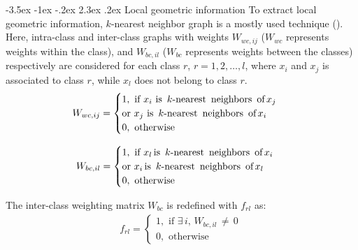 \documentclass[12pt,a4paper,oneside,english]{report}
\makeatletter
\renewcommand\section{\@startsection {section}{1}{\z@}%
                                   {-3.5ex \@plus -1ex \@minus -.2ex}%
                                   {2.3ex \@plus.2ex}%
                                   {\centering\normalfont\LARGE\bfseries}}
\makeatother
\begin{document}
\section{Local geometric information}
To extract local geometric information,  $k$-nearest neighbor graph is a mostly used technique (\cite{hanifelou2018knn}). Here, intra-class and inter-class graphs with weights $W_{wc,ij}$ ($W_{wc}$ represents weights within the class), and $W_{bc,il}$ ($W_{bc}$ represents weights between the classes) respectively are considered for each class $r$, $r=1,2,\ldots, l$, where $x_i$ and $x_j$ is associated to class $r$, while $x_l$ does not belong to class $r$. 
\begin{eqnarray}
W_{wc,ij} = 
\begin{cases}
    1,\,\,\text{if}\,\, x_i\mbox{ is \,$k$-nearest\, neighbors\, of}\, x_j\,\,\nonumber\\ \mbox{or}\,\, x_j\mbox{ is\, $k$-nearest\, neighbors\, of}\, x_i  \\
    0,\,\,\text{otherwise}\label{qpp7}   
\end{cases} 
\end{eqnarray}

\begin{eqnarray}
W_{bc,il} = 
\begin{cases}
    1,\,\,   \text{if}\,\, x_l\, \mbox{is \,$k$-nearest\, neighbors\, of}\, x_i \,\,\nonumber\\ \mbox{or}\,\, x_i\, \mbox{is\, $k$-nearest\, neighbors\, of}\, x_l \\
    0,\,\,    \text{otherwise}\label{qpp8}
\end{cases}     
 \end{eqnarray} 
 
The inter-class weighting matrix $W_{bc}$ is redefined with $f_{rl}$ as: 
\begin{eqnarray}
f_{rl} =   
\begin{cases}
   1,\,\,    \text{if}\,\, \exists \, i,\,W_{bc,il} \,\neq\,0\, \\
   0,\,\,   \text{otherwise}   \label{qpp9}
\end{cases}
\end{eqnarray}  
\end{document}

